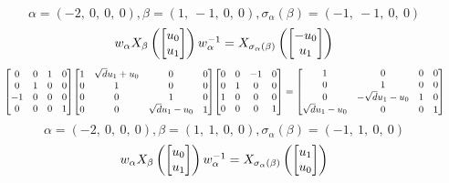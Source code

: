 \documentclass[11pt]{article}
\theoremstyle{definition}
\begin{document}
\[
\alpha = \left( -2, \  0, \  0, \  0\right), \beta = \left( 1, \  -1, \  0, \  0\right), \sigma_{\alpha}(\beta) = \left( -1, \  -1, \  0, \  0\right)
\]
\[
\scaletoalign{\textwidth}{w_{\alpha} X_{\beta}\left(\left[\begin{matrix}u_{0}\\u_{1}\end{matrix}\right]\right) w_{\alpha}^{-1} = X_{\sigma_{\alpha}\left(\beta\right)}\left(\left[\begin{matrix}- u_{0}\\u_{1}\end{matrix}\right]\right)}
\]
\[
\scaletoalign{\textwidth}{{\left[\begin{matrix}0 & 0 & 1 & 0\\0 & 1 & 0 & 0\\-1 & 0 & 0 & 0\\0 & 0 & 0 & 1\end{matrix}\right]} {\left[\begin{matrix}1 & \sqrt{d} u_{1} + u_{0} & 0 & 0\\0 & 1 & 0 & 0\\0 & 0 & 1 & 0\\0 & 0 & \sqrt{d} u_{1} - u_{0} & 1\end{matrix}\right]} {\left[\begin{matrix}0 & 0 & -1 & 0\\0 & 1 & 0 & 0\\1 & 0 & 0 & 0\\0 & 0 & 0 & 1\end{matrix}\right]} = {\left[\begin{matrix}1 & 0 & 0 & 0\\0 & 1 & 0 & 0\\0 & - \sqrt{d} u_{1} - u_{0} & 1 & 0\\\sqrt{d} u_{1} - u_{0} & 0 & 0 & 1\end{matrix}\right]}}
\]
\[
\alpha = \left( -2, \  0, \  0, \  0\right), \beta = \left( 1, \  1, \  0, \  0\right), \sigma_{\alpha}(\beta) = \left( -1, \  1, \  0, \  0\right)
\]
\[
\scaletoalign{\textwidth}{w_{\alpha} X_{\beta}\left(\left[\begin{matrix}u_{0}\\u_{1}\end{matrix}\right]\right) w_{\alpha}^{-1} = X_{\sigma_{\alpha}\left(\beta\right)}\left(\left[\begin{matrix}u_{1}\\u_{0}\end{matrix}\right]\right)}
\]
\end{document}
